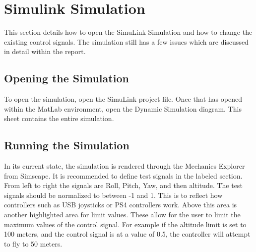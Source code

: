 \section{Simulink Simulation}

This section details how to open the SimuLink Simulation and how to change the existing control signals.  The simulation still has a few issues which are discussed in detail within the report.

\subsection{Opening the Simulation}
To open the simulation, open the SimuLink project file.  Once that has opened within the MatLab environment, open the Dynamic Simulation diagram.  This sheet contains the entire simulation.

\subsection{Running the Simulation}

In its current state, the simulation is rendered through the Mechanics Explorer from Simscape.  It is recommended to define test signals in the labeled section.  From left to right the signals are Roll, Pitch, Yaw, and then altitude. The test signals should be normalized to between -1 and 1.  This is to reflect how controllers such as USB joysticks or PS4 controllers work.  Above this area is another highlighted area for limit values.  These allow for the user to limit the maximum values of the control signal.  For example if the altitude limit is set to 100 meters, and the control signal is at a value of 0.5, the controller will attempt to fly to 50 meters.